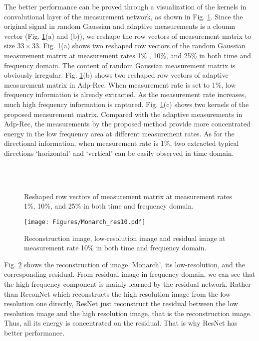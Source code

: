 \documentclass[review]{elsarticle}
\begin{document}
The better performance can be proved through a visualization of the kernels in convolutional layer of the measurement network, as shown in Fig. \ref{fig:measurements}. Since the original signal in  random Gaussian and adaptive measurements is a cloumn vector (Fig. \ref{fig:measurements}(a) and (b)), we reshape the row vectors of measurement matrix to size $33\times33$. Fig. \ref{fig:measurements}(a) shows two reshaped row vectors of the random Gaussian measurement matrix at measurement rates 1\% , 10\%, and 25\% in both time and frequency domain. The content of random Gaussian measurement matrix is obviously irregular. Fig. \ref{fig:measurements}(b) shows two reshaped row vectors of adaptive measurement matrix in Adp-Rec. When measurement rate is set to 1\%, low frequency information is already extracted. As the measurement rate increases, much high frequency information is  captured. Fig. \ref{fig:measurements}(c) shows two kernels of the proposed measurement matrix. Compared with the adaptive measurements in Adp-Rec, the measurements by the proposed method provide more concentrated energy in the low frequency area at different measurement rates. As for the directional information, when measurement rate is 1\%, two extracted typical directions `horizontal' and `vertical' can be easily observed in time domain.

\begin{figure}[h!]
	\centering
	 \\
	 \\
	\caption{Reshaped row vectors of measurement matrix at measurement rates 1\%, 10\%, and 25\% in both time and frequency domain.}
	\label{fig:measurements}
\end{figure}

\begin{figure}[h!]
	\centering
	\texttt{[image: Figures/Monarch\_res10.pdf]}
	\caption{Reconstruction image, low-resolution image and residual image at measurement rate 10\%  in both time and frequency domain.}
	\label{fig:Monarch_res10}
\end{figure}

Fig. \ref{fig:Monarch_res10} shows the reconstruction of image `Monarch', its low-resolution, and the corresponding residual.
From residual image in frequency domain, we can see that the high frequency component is mainly learned by the residual network.  Rather than ReconNet which reconstructs the high resolution image from the low resolution one directly, ResNet just reconstruct the residual between the low resolution image and the high resolution image, that is the reconstruction image. Thus, all its energy is concentrated on the residual. That is why ResNet has better performance.
\end{document}
